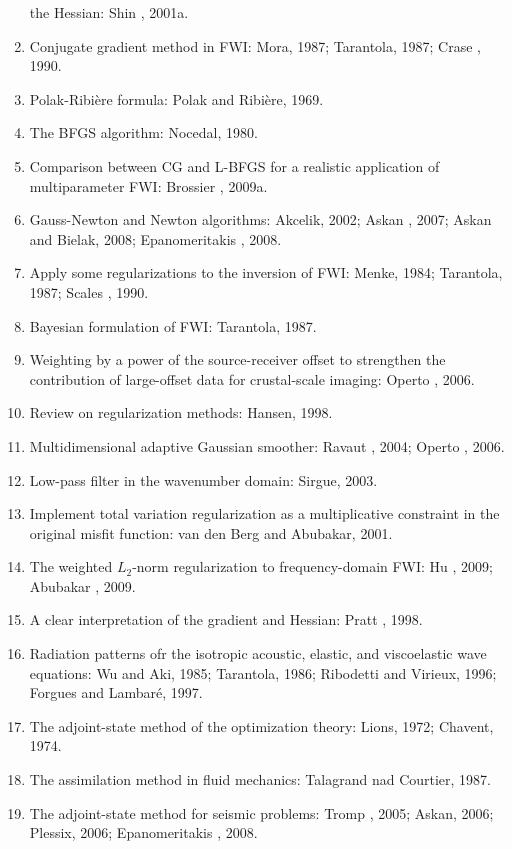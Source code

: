 \begin{enumerate}[\hspace{10mm}*]
    the Hessian: Shin \etal, 2001a.
  \item Conjugate gradient method in FWI: Mora, 1987;
    Tarantola, 1987; Crase \etal, 1990.
  \item Polak-Ribi\`ere formula: Polak and Ribi\`ere, 1969.
  \item The BFGS algorithm: Nocedal, 1980.
  \item Comparison between CG and L-BFGS for a realistic application of
    multiparameter FWI: Brossier \etal, 2009a.
  \item Gauss-Newton and Newton algorithms: Akcelik, 2002; Askan \etal, 2007;
    Askan and Bielak, 2008; Epanomeritakis \etal, 2008.
  \item Apply some regularizations to the inversion of FWI:
    Menke, 1984; Tarantola, 1987; Scales \etal, 1990.
  \item Bayesian formulation of FWI: Tarantola, 1987.
  \item Weighting by a power of the source-receiver offset to strengthen
    the contribution of large-offset data for crustal-scale imaging:
    Operto \etal, 2006.
  \item Review on regularization methods: Hansen, 1998.
  \item Multidimensional adaptive Gaussian smoother:
    Ravaut \etal, 2004; Operto \etal, 2006.
  \item Low-pass filter in the wavenumber domain: Sirgue, 2003.
  \item Implement total variation regularization as a multiplicative constraint
    in the original misfit function: van den Berg and Abubakar, 2001.
  \item The weighted $L_2$-norm regularization to frequency-domain FWI:
    Hu \etal, 2009; Abubakar \etal, 2009.
  \item A clear interpretation of the gradient and Hessian: Pratt \etal, 1998.
  \item Radiation patterns ofr the isotropic acoustic, elastic,
    and viscoelastic wave equations: Wu and Aki, 1985; Tarantola, 1986;
    Ribodetti and Virieux, 1996; Forgues and Lambar\'e, 1997.
  \item The adjoint-state method of the optimization theory:
    Lions, 1972; Chavent, 1974.
  \item The assimilation method in fluid mechanics:
    Talagrand nad Courtier, 1987.
  \item The adjoint-state method for seismic problems: Tromp \etal, 2005;
    Askan, 2006; Plessix, 2006; Epanomeritakis \etal, 2008.

\end{enumerate}
